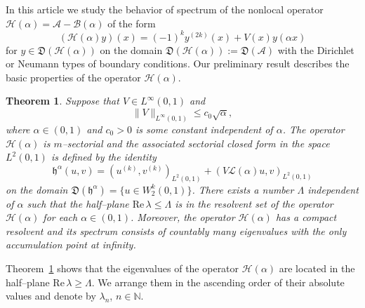 \documentclass[11pt,centertags,reqno,twoside]{amsart}
\numberwithin{equation}{section}
\newtheorem{theorem}{Theorem}
\theoremstyle{definition}
\theoremstyle{remark}
\begin{document}
In this article we study the behavior of spectrum of the nonlocal
operator $\mathcal{H}(\alpha)=\mathcal{A}-\mathcal{B}(\alpha)$ of the form
\[
(\mathcal{H}(\alpha)y)(x)=(-1)^ky^{(2k)}(x)+V(x)y(\alpha x)
\]
for $y\in\mathfrak{D}(\mathcal{H}(\alpha))$ on the domain
$\mathfrak{D}(\mathcal{H}(\alpha)):=\mathfrak{D}(\mathcal{A})$
with the Dirichlet or Neumann types of boundary conditions.
Our preliminary result describes the basic properties of the operator
$\mathcal{H}(\alpha)$.
\begin{theorem}\label{th0}
Suppose that $V\in L^\infty(0, 1)$ and
\begin{equation}\label{Vc1lalpha}
\|V\|_{L^\infty(0, 1)}\leqslant c_0\sqrt{\alpha},
\end{equation}
where $\alpha\in (0, 1)$ and $c_0>0$ is some constant independent of $\alpha$.
The operator $\mathcal{H}(\alpha)$ is $m$--sectorial
and the associated sectorial closed form in the space $L^2(0, 1)$ is defined by the identity
\begin{equation}\label{2.1}
\mathfrak{h}^\alpha(u, v)=(u^{(k)}, v^{(k)})_{L^2(0, 1)}
+(V\mathcal{L}(\alpha)u, v)_{L^2(0, 1)}
\end{equation}
on the domain $\mathfrak{D}(\mathfrak{h}^\alpha)=\{u\in W_2^k(0, 1)\}$.
There exists a number $\Lambda$ independent of $\alpha$ such that the half--plane
$\mathrm{Re}\,\lambda\leqslant \Lambda$ is in the resolvent set of the operator
$\mathcal{H}(\alpha)$ for each $\alpha\in (0, 1)$. Moreover, the operator
$\mathcal{H}(\alpha)$ has a compact resolvent and its spectrum consists of
countably many eigenvalues with the only accumulation point at infinity.
\end{theorem}

Theorem~\ref{th0} shows that the eigenvalues of the operator $\mathcal{H}(\alpha)$
are located in the half--plane $\mathrm{Re}\,\lambda\geqslant \Lambda$.
We arrange them in the ascending order of their absolute values and denote
by $\lambda_n$, $n\in\mathbb{N}$.
\end{document}
